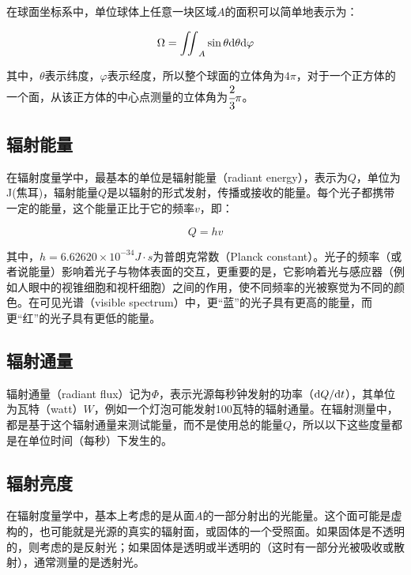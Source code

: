 在球面坐标系中，单位球体上任意一块区域$A$的面积可以简单地表示为：

\begin{equation}
	\Omega= {\rm \iint}_A \sin\theta {\rm d}\theta {\rm d}\varphi
\end{equation}

\noindent 其中，$\theta$表示纬度，$\varphi$表示经度，所以整个球面的立体角为$4\pi$，对于一个正方体的一个面，从该正方体的中心点测量的立体角为$ \cfrac{2}{3}\pi$。




\subsection{辐射能量}
在辐射度量学中，最基本的单位是辐射能量（radiant energy），表示为$Q$，单位为J(焦耳)，辐射能量$Q$是以辐射的形式发射，传播或接收的能量。每个光子都携带一定的能量，这个能量正比于它的频率$v$，即：

\begin{equation}
	Q=hv
\end{equation}

\noindent 其中，$h=6.62620\times 10^{-34} J\cdot s$为普朗克常数（Planck constant）。光子的频率（或者说能量）影响着光子与物体表面的交互，更重要的是，它影响着光与感应器（例如人眼中的视锥细胞和视杆细胞）之间的作用，使不同频率的光被察觉为不同的颜色。在可见光谱（visible spectrum）中，更“蓝”的光子具有更高的能量，而更“红”的光子具有更低的能量。 




\subsection{辐射通量}
辐射通量（radiant flux）记为$\Phi$，表示光源每秒钟发射的功率（${\rm d}Q/{\rm d}t$），其单位为瓦特（watt）$W$，例如一个灯泡可能发射100瓦特的辐射通量。在辐射测量中，都是基于这个辐射通量来测试能量，而不是使用总的能量$Q$，所以以下这些度量都是在单位时间（每秒）下发生的。





\subsection{辐射亮度}
在辐射度量学中，基本上考虑的是从面$A$的一部分射出的光能量。这个面可能是虚构的，也可能就是光源的真实的辐射面，或固体的一个受照面。如果固体是不透明的，则考虑的是反射光；如果固体是透明或半透明的（这时有一部分光被吸收或散射），通常测量的是透射光。

